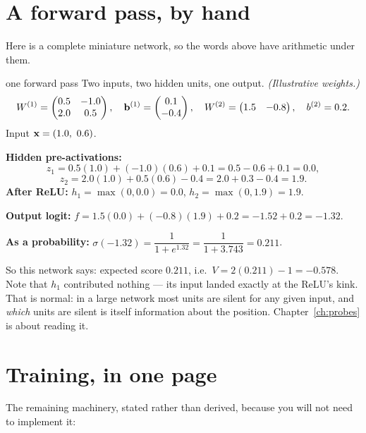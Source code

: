 \section{A forward pass, by hand}

Here is a complete miniature network, so the words above have arithmetic under them.

\begin{worked}{one forward pass}
Two inputs, two hidden units, one output. \emph{(Illustrative weights.)}
\[
W^{(1)} = \begin{pmatrix} 0.5 & -1.0 \\ 2.0 & 0.5\end{pmatrix},\quad
\mathbf{b}^{(1)} = \begin{pmatrix} 0.1 \\ -0.4 \end{pmatrix},\quad
W^{(2)} = \begin{pmatrix} 1.5 & -0.8\end{pmatrix},\quad b^{(2)} = 0.2 .
\]
Input $\vv{x} = (1.0,\ 0.6)$.

\smallskip
\textbf{Hidden pre-activations:}
\[
z_1 = 0.5(1.0) + (-1.0)(0.6) + 0.1 = 0.5 - 0.6 + 0.1 = 0.0,
\]
\[
z_2 = 2.0(1.0) + 0.5(0.6) - 0.4 = 2.0 + 0.3 - 0.4 = 1.9 .
\]
\textbf{After ReLU:} $h_1 = \max(0, 0.0) = 0.0$, $h_2 = \max(0, 1.9) = 1.9$.

\smallskip
\textbf{Output logit:} $f = 1.5(0.0) + (-0.8)(1.9) + 0.2 = -1.52 + 0.2 = -1.32$.

\smallskip
\textbf{As a probability:} $\sigma(-1.32) = \dfrac{1}{1+e^{1.32}} = \dfrac{1}{1+3.743} = 0.211$.

\smallskip
So this network says: expected score $0.211$, i.e.\ $V = 2(0.211) - 1 = -0.578$. Note that
$h_1$ contributed nothing --- its input landed exactly at the ReLU's kink. That is normal:
in a large network most units are silent for any given input, and \emph{which} units are
silent is itself information about the position. Chapter~\ref{ch:probes} is about reading it.
\end{worked}

\section{Training, in one page}

The remaining machinery, stated rather than derived, because you will not need to implement
it:

